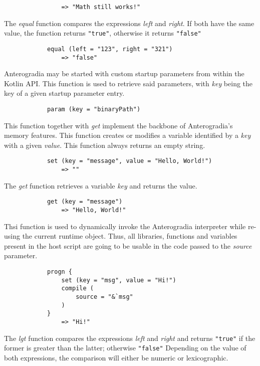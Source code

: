 \begin{multicols}{2}
\begin{verbatim}
			    => "Math still works!"
    \end{verbatim}
    \spacing
    The \textit{equal} function compares the expressions \textit{left} and \textit{right}. If both have the same value,
    the function returns \verb|"true"|, otherwise it returns \verb|"false"|
    \begin{verbatim}
			equal (left = "123", right = "321")
			    => "false"
    \end{verbatim}
    \spacing
    Anterogradia may be started with custom startup parameters from within the Kotlin API. This function is used to retrieve said parameters,
    with \textit{key} being the key of a given startup parameter entry.
    \begin{verbatim}
			param (key = "binaryPath")
    \end{verbatim}
    This function together with \textit{get} implement the backbone of Anterogradia's memory features. This function creates or modifies
    a variable identified by a \textit{key} with a given \textit{value}. This function always returns an empty string.
    \begin{verbatim}
			set (key = "message", value = "Hello, World!")
			    => ""
    \end{verbatim}
    \spacing
    The \textit{get} function retrieves a variable \textit{key} and returns the value.
    \begin{verbatim}
			get (key = "message")
			    => "Hello, World!"
    \end{verbatim}
    \spacing
    Thsi function is used to dynamically invoke the Anterogradia interpreter while re-using the current runtime object. Thus, all
    libraries, functions and variables present in the host script are going to be usable in the code passed to the \textit{source}
    parameter.
    \begin{verbatim}
			progn {
			    set (key = "msg", value = "Hi!")
			    compile (
			        source = "&`msg"
			    )
			}
			    => "Hi!"
    \end{verbatim}
    The \textit{lgt} function compares the expressions \textit{left} and \textit{right} and returns \verb|"true"| if
    the former is greater than the latter; otherwise \verb|"false"| Depending on the value of both expressions, the comparison will either be
    numeric or lexicographic.
    \begin{verbatim}

\end{verbatim}
\end{multicols}
